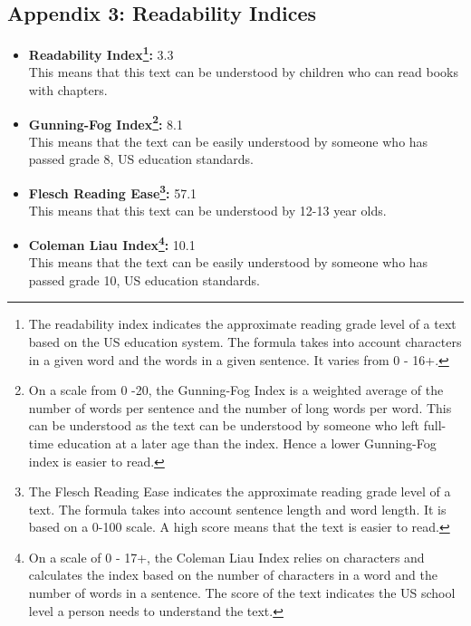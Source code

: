 \documentclass[12pt]{article} %
\begin{document}
\begin{appendices}
\section{Appendix 3: Readability Indices}
    \begin{itemize}
        \item \textbf{Readability Index\footnote{The readability index indicates the approximate reading grade level of a text based on the US education system. The formula takes into account characters in a given word and the words in a given sentence. It varies from 0 - 16+.}:} 3.3 
        \\This means that this text can be understood by children who can read books with chapters. 
        \item \textbf{Gunning-Fog Index\footnote{On a scale from 0 -20, the Gunning-Fog Index is a weighted average of the number of words per sentence and the number of long words per word. This can be understood as the text can be understood by someone who left full-time education at a later age than the index. Hence a lower Gunning-Fog index is easier to read.}:} 8.1 
        \\This means that the text can be easily understood by someone who has passed grade 8, US education standards.
        \item \textbf{Flesch Reading Ease\footnote{The Flesch Reading Ease indicates the approximate reading grade level of a text. The formula takes into account sentence length and word length. It is based on a 0-100 scale. A high score means that the text is easier to read.}:} 57.1 \\This means that this text can be understood by 12-13 year olds.
        \item \textbf{Coleman Liau Index\footnote{On a scale of 0 - 17+, the Coleman Liau Index relies on characters and calculates the index based on the number of characters in a word and the number of words in a sentence. The score of the text indicates the US school level a person needs to understand the text.}:} 10.1 
        \\This means that the text can be easily understood by someone who has passed grade 10, US education standards.

    \end{itemize}
\end{appendices}
\clearpage
\end{document}
